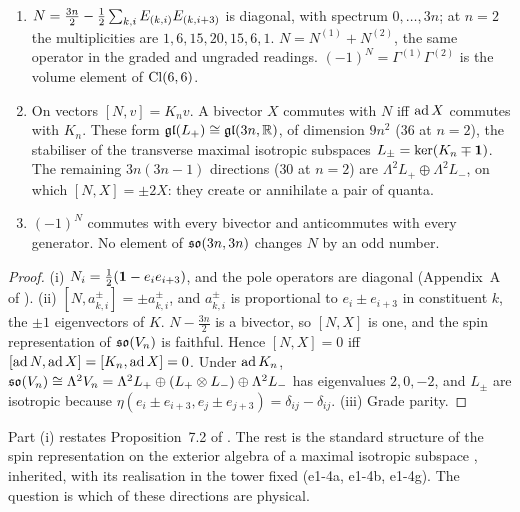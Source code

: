 \begin{proposition}
\label{e1:prop:Nbiv}
\begin{enumerate}[label=(\roman*),leftmargin=2.2em]
\item $N=\tfrac{3n}2-\tfrac12\sum_{k,i}E_{(k,i)}E_{(k,i+3)}$ is diagonal, with spectrum $0,\dots,3n$; at $n=2$ the multiplicities are
$1,6,15,20,15,6,1$. $N=N^{(1)}+N^{(2)}$, the same operator in the graded and ungraded readings. $(-1)^N=\Gamma^{(1)}\Gamma^{(2)}$ is the volume element of
$\mathrm{Cl}(6,6)$.
\item On vectors $[N,v]=K_nv$. A bivector $X$ commutes with $N$ iff $\operatorname{ad} X$ commutes with $K_n$. These form
$\mathfrak{gl}(L_+)\cong\mathfrak{gl}(3n,\mathbb{R})$, of dimension $9n^2$ ($36$ at $n=2$), the stabiliser of the transverse maximal isotropic subspaces
$L_\pm=\ker(K_n\mp\mathbf 1)$. The remaining $3n(3n-1)$ directions ($30$ at $n=2$) are $\Lambda^2L_+\oplus\Lambda^2L_-$, on which $[N,X]=\pm2X$: they create
or annihilate a pair of quanta.
\item $(-1)^N$ commutes with every bivector and anticommutes with every generator. No element of $\mathfrak{so}(3n,3n)$ changes $N$ by an odd number.
\end{enumerate}
\end{proposition}

\begin{proof}
(i) $N_i=\tfrac12(\mathbf 1-e_ie_{i+3})$, and the pole operators are diagonal (Appendix~A of \cite{ES17}). (ii) $[N,a^\pm_{k,i}]=\pm a^\pm_{k,i}$, and
$a^\pm_{k,i}$ is proportional to $e_i\pm e_{i+3}$ in constituent $k$, the $\pm1$ eigenvectors of $K$. $N-\tfrac{3n}2$ is a bivector, so $[N,X]$
is one, and the spin representation of $\mathfrak{so}(V_n)$ is faithful. Hence $[N,X]=0$ iff $[\operatorname{ad} N,\operatorname{ad} X]=[K_n,\operatorname{ad} X]=0$. Under $\operatorname{ad} K_n$,
$\mathfrak{so}(V_n)\cong\Lambda^2V_n=\Lambda^2L_+\oplus(L_+\otimes L_-)\oplus\Lambda^2L_-$ has eigenvalues $2,0,-2$, and $L_\pm$ are isotropic because
$\eta(e_i\pm e_{i+3},e_j\pm e_{j+3})=\delta_{ij}-\delta_{ij}$. (iii) Grade parity.
\end{proof}

Part (i) restates Proposition~7.2 of \cite{RE}. The rest is the standard structure of the spin representation on the exterior algebra of
a maximal isotropic subspace \cite{Chevalley54}, inherited, with its realisation in the tower fixed (e1-4a, e1-4b, e1-4g). The question
is which of these directions are physical.

